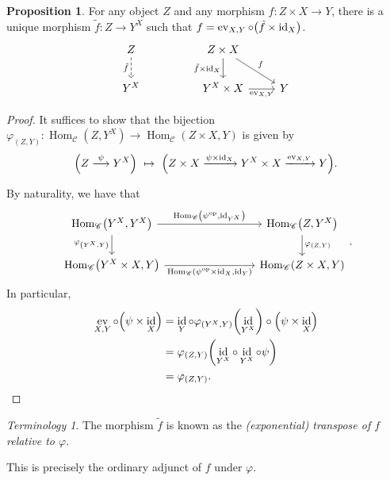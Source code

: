 \documentclass[10pt,letterpaper,cm]{nupset}
\theoremstyle{definition}
\theoremstyle{theorem}
\newtheorem{prop}[definition]{Proposition}
\theoremstyle{remark}
\newtheorem*{term}{Terminology}
\DeclareMathOperator{\ev}{ev}
\newcommand{\0}{\mathbf{0}}
\newcommand{\1}{\mathbf{1}}
\newcommand{\2}{\mathbf{2}}
\DeclareMathOperator{\op}{op}
\renewcommand{\c}{\mathscr{C}}
\DeclareMathOperator{\Hom}{Hom}
\DeclareMathOperator{\idd}{id}
\begin{document}
\begin{prop}
For any object $Z$ and any morphism $f: Z \times X \to Y$, there is a unique morphism $\tilde{f} :Z \to Y^X$ such that $ f= \ev_{X,Y} \circ \mleft(\tilde{f} \times \idd_X\mright)$.
\[
\begin{tikzcd}
Z \arrow[d, "\tilde{f}"', dashed] &  & Z \times X \arrow[d, "\tilde{f} \times \idd_X"'] \arrow[rd, "f"] &   \\
Y^X                                &  & Y^X \times X \arrow[r, "{\ev_{X,Y}}"']                           & Y
\end{tikzcd}
\]

\end{prop}
\begin{proof}
It suffices to show that the bijection $ \varphi_{(Z, Y)} : \Hom_{\c}({Z}, Y^X) \to \Hom_{\c}(Z\times X, {Y})$ is given by
\[
\mleft(Z \overset{\psi}{\longrightarrow} Y^X\mright) \ \mapsto \  \mleft(Z \times X \xrightarrow{\psi \times \idd_X } Y^X \times X \xrightarrow{\ev_{X,Y} } Y\mright)
.\] 

By naturality, we have that
\[
\begin{tikzcd}[column sep =19ex]
{\Hom_{\c}\mleft(Y^X, Y^X\mright)} \arrow[d, "{\varphi_{\mleft(Y^X, Y\mright)}}"'] \arrow[r, "{\Hom_{\c}\mleft(\psi^{\op} , \idd_{Y^X}\mright)}"] & {\Hom_{\c}\mleft(Z, Y^X\mright)} \arrow[d, "{\varphi_{\mleft(Z, Y\mright)}}"] \\
{\Hom_{\c}\mleft(Y^X \times X, Y\mright)} \arrow[r, "{\Hom_{\c}\mleft(\psi^{\op} \times \idd_X, \idd_Y\mright)}"']                    & {\Hom_{\c}\mleft(Z \times X, Y\mright)}                         
\end{tikzcd}
.\]
In particular,
\begin{align*}
\ev_{X, Y} \circ \mleft(\psi \times \idd_X\mright) & = \idd_Y \circ \varphi_{\mleft(Y^X, Y\mright)}\mleft(\idd_{Y^X}\mright) \circ \mleft(\psi \times \idd_X\mright)
\\ & = \varphi_{\mleft(Z,Y\mright)}\mleft(\idd_{Y^X} \circ \idd_{Y^X} \circ \psi\mright) 
\\ &= \varphi_{\mleft(Z,Y\mright)}
.
\end{align*}
\end{proof}

\begin{term}
The morphism $\tilde{f}$ is known as the \textit{(exponential) transpose of $f$ relative to $\varphi$}.
\end{term}

This is precisely the ordinary adjunct of $f$ under $\varphi$.
\end{document}
